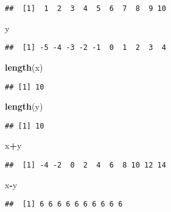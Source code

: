 \documentclass[
]{article}
\newenvironment{Shaded}{\begin{snugshade}}{\end{snugshade}}
\newcommand{\FunctionTok}[1]{\textcolor[rgb]{0.13,0.29,0.53}{\textbf{#1}}}
\newcommand{\NormalTok}[1]{#1}
\newcommand{\SpecialCharTok}[1]{\textcolor[rgb]{0.81,0.36,0.00}{\textbf{#1}}}
\begin{document}
\begin{verbatim}
##  [1]  1  2  3  4  5  6  7  8  9 10
\end{verbatim}

\begin{Shaded}
\begin{Highlighting}[]
\NormalTok{y}
\end{Highlighting}
\end{Shaded}

\begin{verbatim}
##  [1] -5 -4 -3 -2 -1  0  1  2  3  4
\end{verbatim}

\begin{Shaded}
\begin{Highlighting}[]
\FunctionTok{length}\NormalTok{(x)}
\end{Highlighting}
\end{Shaded}

\begin{verbatim}
## [1] 10
\end{verbatim}

\begin{Shaded}
\begin{Highlighting}[]
\FunctionTok{length}\NormalTok{(y)}
\end{Highlighting}
\end{Shaded}

\begin{verbatim}
## [1] 10
\end{verbatim}

\begin{Shaded}
\begin{Highlighting}[]
\NormalTok{x}\SpecialCharTok{+}\NormalTok{y}
\end{Highlighting}
\end{Shaded}

\begin{verbatim}
##  [1] -4 -2  0  2  4  6  8 10 12 14
\end{verbatim}

\begin{Shaded}
\begin{Highlighting}[]
\NormalTok{x}\SpecialCharTok{{-}}\NormalTok{y}
\end{Highlighting}
\end{Shaded}

\begin{verbatim}
##  [1] 6 6 6 6 6 6 6 6 6 6
\end{verbatim}
\end{document}
